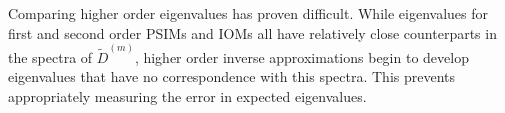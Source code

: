 \documentclass{sfuthesis}
\begin{document}
Comparing higher order eigenvalues has proven difficult.
While eigenvalues for first and second order PSIMs and IOMs all have relatively close counterparts in the spectra of $\tilde{D}^{(m)}$,
higher order inverse approximations begin to develop eigenvalues that have no correspondence with this spectra.
This prevents appropriately measuring the error in expected eigenvalues.


%
%
%
\end{document}

